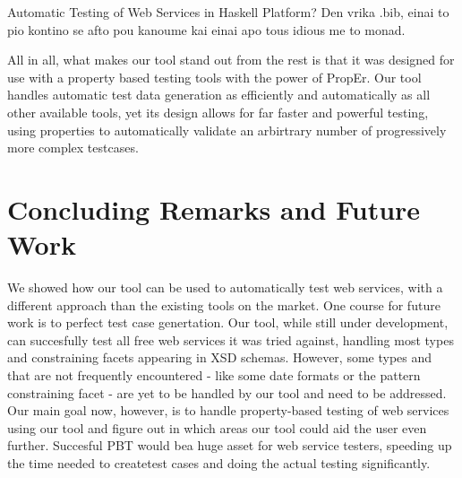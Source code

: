 \documentclass[submission,copyright,a4]{eptcs}
\begin{document}
Automatic Testing of Web Services in Haskell Platform? Den vrika .bib, einai to pio kontino se afto pou kanoume kai einai apo tous idious me to monad.

All in all, what makes our tool stand out from the rest is that it 
was designed for use with a property based testing tools with the 
power of PropEr. Our tool handles automatic test data generation as
efficiently and automatically as all other available tools, yet its
design allows for far faster and powerful testing, using properties 
to automatically validate an arbirtrary number of progressively more 
complex testcases.

\section{Concluding Remarks and Future Work}

We showed how our tool can be used to automatically test web services, with a
different approach than the existing tools on the market. 
One course for future work is to perfect test case genertation. Our tool, 
while still under development, can succesfully test all free web services it was 
tried against, handling most types and constraining facets appearing in XSD 
schemas. However, some types and that are not frequently encountered - like some
date formats or the pattern constraining facet - are yet to be handled by our
tool and need to be addressed.
Our main goal now, however, is to handle property-based testing of web services 
using our tool and figure out in which areas our tool could aid the user even 
further. Succesful PBT would bea huge asset for web service testers, speeding 
up the time needed to createtest cases and doing the actual testing 
significantly.



\end{document}
